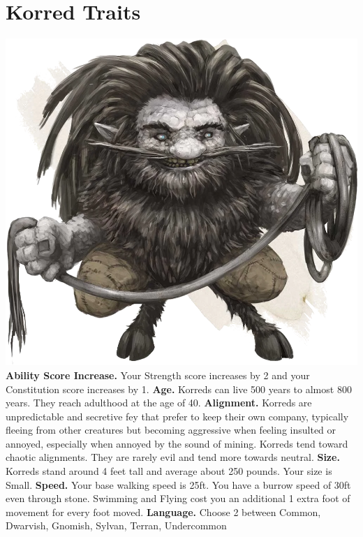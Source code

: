 \documentclass[a4paper,10pt,twoside,twocolumn]{dndbook} %
\begin{document}
	\section{Korred Traits}
	\includegraphics[width=\linewidth]{Korred5e.png}
	\textbf{Ability Score Increase.} Your Strength score increases by 2 and your Constitution score increases by 1.\linebreak
	\textbf{Age.} Korreds can live 500 years to almost 800 years. They reach adulthood at the age of 40.\linebreak
	\textbf{Alignment.} Korreds are unpredictable and secretive fey that prefer to keep their own company, typically fleeing from other creatures but becoming aggressive when feeling insulted or annoyed, especially when annoyed by the sound of mining. Korreds tend toward chaotic alignments. They are rarely evil and tend more towards neutral.\linebreak
	\textbf{Size.} Korreds stand around 4 feet tall and average about 250 pounds. Your size is Small.\linebreak
	\textbf{Speed.} Your base walking speed is 25ft. You have a burrow speed of 30ft even through stone. Swimming and Flying cost you an additional 1 extra foot of movement for every foot moved.\linebreak
	\textbf{Language.} Choose 2 between Common, Dwarvish, Gnomish, Sylvan, Terran, Undercommon\linebreak
\end{document}
